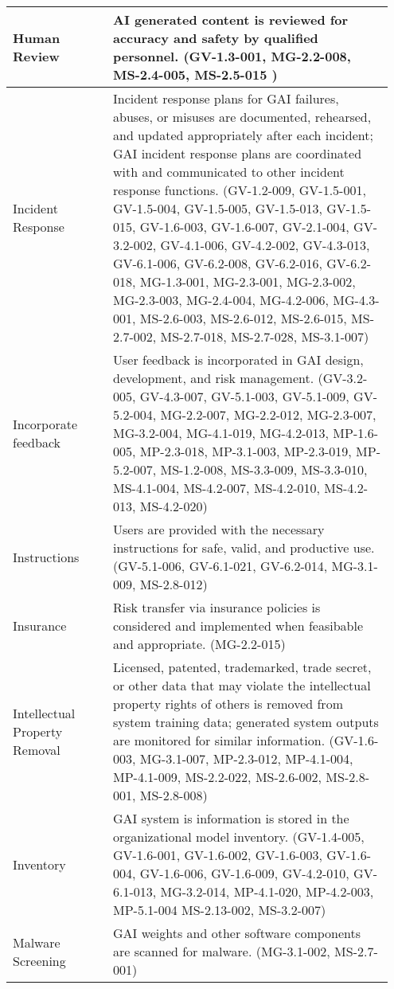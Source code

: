 \documentclass[fleqn]{article}
\begin{document}
\begin{table}[H]
\begin{tabular}{|m{0.25\linewidth} |m{0.70\linewidth} |}
		\hline
		Human Review  & AI generated content is reviewed for accuracy and safety by qualified personnel. (GV-1.3-001, MG-2.2-008, MS-2.4-005, MS-2.5-015 ) \\ 
		\hline
		Incident Response & Incident response plans for GAI failures, abuses, or misuses are documented, rehearsed, and updated appropriately after each incident; GAI incident response plans are coordinated with and communicated to other incident response functions. (GV-1.2-009, GV-1.5-001, GV-1.5-004, GV-1.5-005, GV-1.5-013, GV-1.5-015, GV-1.6-003, GV-1.6-007, GV-2.1-004, GV-3.2-002, GV-4.1-006, GV-4.2-002, GV-4.3-013, GV-6.1-006, GV-6.2-008, GV-6.2-016, GV-6.2-018, MG-1.3-001, MG-2.3-001, MG-2.3-002, MG-2.3-003, MG-2.4-004, MG-4.2-006, MG-4.3-001, MS-2.6-003, MS-2.6-012, MS-2.6-015, MS-2.7-002, MS-2.7-018, MS-2.7-028, MS-3.1-007) \\ \hline
		Incorporate feedback & User feedback is incorporated in GAI design, development, and risk management. (GV-3.2-005, GV-4.3-007, GV-5.1-003, GV-5.1-009, GV-5.2-004, MG-2.2-007, MG-2.2-012, MG-2.3-007, MG-3.2-004, MG-4.1-019, MG-4.2-013, MP-1.6-005, MP-2.3-018, MP-3.1-003, MP-2.3-019, MP-5.2-007, MS-1.2-008, MS-3.3-009, MS-3.3-010, MS-4.1-004, MS-4.2-007, MS-4.2-010, MS-4.2-013, MS-4.2-020)  \\ \hline
		Instructions & Users are provided with the necessary instructions for safe, valid, and productive use. (GV-5.1-006, GV-6.1-021, GV-6.2-014, MG-3.1-009, MS-2.8-012) \\ \hline
		Insurance & Risk transfer via insurance policies is considered and implemented when feasibable and appropriate. (MG-2.2-015) \\ 
		\hline
		Intellectual Property Removal & Licensed, patented, trademarked, trade secret, or other data that may violate the intellectual property rights of others is removed from system training data; generated system outputs are monitored for similar information. (GV-1.6-003, MG-3.1-007, MP-2.3-012, MP-4.1-004, MP-4.1-009, MS-2.2-022, MS-2.6-002, MS-2.8-001, MS-2.8-008) \\ 
		\hline
		Inventory & GAI system is information is stored in the organizational model inventory. (GV-1.4-005, GV-1.6-001, GV-1.6-002, GV-1.6-003, GV-1.6-004, GV-1.6-006, GV-1.6-009, GV-4.2-010, GV-6.1-013, MG-3.2-014, MP-4.1-020, MP-4.2-003, MP-5.1-004
		MS-2.13-002, MS-3.2-007) \\ 
		\hline
		Malware Screening & GAI weights and other software components are scanned for malware. (MG-3.1-002, MS-2.7-001) \\ 

\end{tabular}
\end{table}
\end{document}
